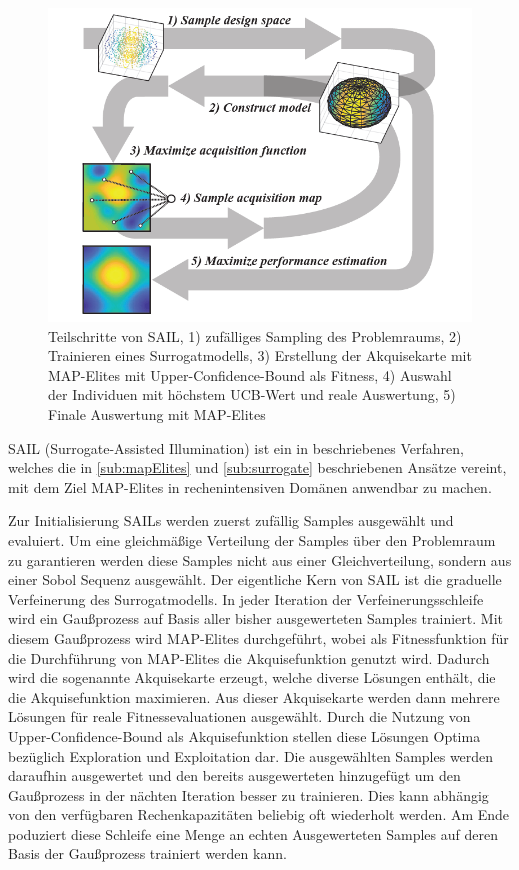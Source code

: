 \begin{figure}[h]
	\centering
	\includegraphics[width=.7\linewidth]{bilder/sail}
	\caption{Teilschritte von SAIL, 
		1) zufälliges Sampling des Problemraums, 
		2) Trainieren eines Surrogatmodells, 
		3) Erstellung der Akquisekarte mit MAP-Elites mit Upper-Confidence-Bound als Fitness, 
		4) Auswahl der Individuen mit höchstem UCB-Wert und reale Auswertung,
		5) Finale Auswertung mit MAP-Elites
	}
	\label{fig:sail}
\end{figure}

SAIL (Surrogate-Assisted Illumination) ist ein in \cite{Gaier.6152018} beschriebenes Verfahren, welches die in \cref{sub:mapElites} und \cref{sub:surrogate} beschriebenen Ansätze vereint, mit dem Ziel MAP-Elites in rechenintensiven Domänen anwendbar zu machen.

Zur Initialisierung SAILs werden zuerst zufällig Samples ausgewählt und evaluiert.
Um eine gleichmäßige Verteilung der Samples über den Problemraum zu garantieren werden diese Samples nicht aus einer Gleichverteilung, sondern aus einer Sobol Sequenz ausgewählt.
Der eigentliche Kern von SAIL ist die graduelle Verfeinerung des Surrogatmodells.
In jeder Iteration der Verfeinerungsschleife wird ein Gaußprozess auf Basis aller bisher ausgewerteten Samples trainiert.
Mit diesem Gaußprozess wird MAP-Elites durchgeführt, wobei als Fitnessfunktion für die Durchführung von MAP-Elites die Akquisefunktion genutzt wird.
Dadurch wird die sogenannte Akquisekarte erzeugt, welche diverse Lösungen enthält, die die Akquisefunktion maximieren.
Aus dieser Akquisekarte werden dann mehrere Lösungen für reale Fitnessevaluationen ausgewählt.
Durch die Nutzung von Upper-Confidence-Bound als Akquisefunktion stellen diese Lösungen Optima bezüglich Exploration und Exploitation dar.
Die ausgewählten Samples werden daraufhin ausgewertet  und den bereits ausgewerteten hinzugefügt um den Gaußprozess in der nächten Iteration besser zu trainieren.
Dies kann abhängig von den verfügbaren Rechenkapazitäten beliebig oft wiederholt werden.
Am Ende poduziert diese Schleife eine Menge an echten Ausgewerteten Samples auf deren Basis der Gaußprozess trainiert werden kann.

